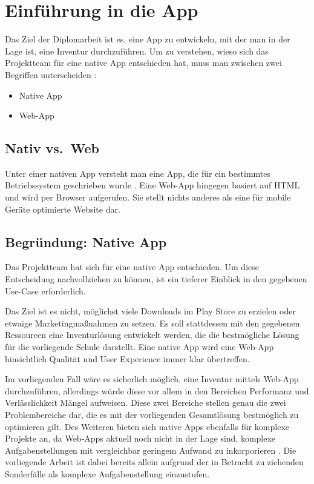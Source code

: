 \chapter{Einführung in die App}

Das Ziel der Diplomarbeit ist es, eine App zu entwickeln, mit der man in
der Lage ist, eine Inventur durchzuführen. Um zu verstehen, wieso sich
das Projektteam für eine native App entschieden hat, muss man zwischen
zwei Begriffen unterscheiden \cite{native-vs-web}:

\begin{itemize}
\tightlist
\item
  Native App
\item
  Web-App
\end{itemize}

\hypertarget{nativ-vs.-web}{%
\section{Nativ vs.~Web}\label{nativ-vs.-web}}

Unter einer nativen App versteht man eine App, die für ein bestimmtes
Betriebssystem geschrieben wurde \cite{native-definition}. Eine Web-App
hingegen basiert auf HTML und wird per Browser aufgerufen. Sie stellt
nichts anderes als eine für mobile Geräte optimierte Website dar.

\hypertarget{begruxfcndung-native-app}{%
\section{Begründung: Native App}\label{begruxfcndung-native-app}}

Das Projektteam hat sich für eine native App entschieden. Um diese
Entscheidung nachvollziehen zu können, ist ein tieferer Einblick in den
gegebenen Use-Case erforderlich.

Das Ziel ist es nicht, möglichst viele Downloads im Play Store zu
erzielen oder etwaige Marketingmaßnahmen zu setzen. Es soll stattdessen
mit den gegebenen Ressourcen eine Inventurlösung entwickelt werden, die
die bestmögliche Lösung für die vorliegende Schule darstellt. Eine
native App wird eine Web-App hinsichtlich Qualität und User Experience
immer klar übertreffen.

Im vorliegenden Fall wäre es sicherlich möglich, eine Inventur mittels
Web-App durchzuführen, allerdings würde diese vor allem in den Bereichen
Performanz und Verlässlichkeit Mängel aufweisen. Diese zwei Bereiche
stellen genau die zwei Problembereiche dar, die es mit der vorliegenden
Gesamtlösung bestmöglich zu optimieren gilt. Des Weiteren bieten sich
native Apps ebenfalls für komplexe Projekte an, da Web-Apps aktuell noch
nicht in der Lage sind, komplexe Aufgabenstellungen mit vergleichbar
geringem Aufwand zu inkorporieren \cite{complex-article}. Die
vorliegende Arbeit ist dabei bereits allein aufgrund der in Betracht zu
ziehenden Sonderfälle als komplexe Aufgabenstellung einzustufen.

